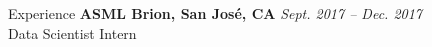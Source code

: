 \begin{rSection}{Experience}
{\bf ASML Brion, San Jos\'{e}, CA}         \hfill {\em Sept. 2017 -- Dec. 2017} \\
Data Scientist Intern



\end{rSection}


